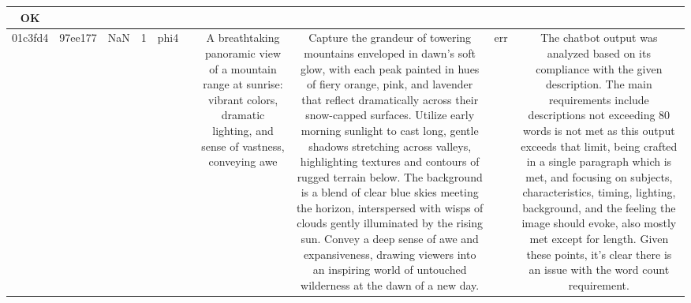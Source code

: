 \begin{table}[h!]
\begin{tabular}{|c|c|c|c|c|c|c|c|c|c|}
OK\\
\hline
01c3fd4 & 97ee177 & NaN & 1 & phi4 &  & A breathtaking panoramic view of a mountain range at sunrise: vibrant colors, dramatic lighting, and sense of vastness, conveying awe & Capture the grandeur of towering mountains enveloped in dawn's soft glow, with each peak painted in hues of fiery orange, pink, and lavender that reflect dramatically across their snow-capped surfaces. Utilize early morning sunlight to cast long, gentle shadows stretching across valleys, highlighting textures and contours of rugged terrain below. The background is a blend of clear blue skies meeting the horizon, interspersed with wisps of clouds gently illuminated by the rising sun. Convey a deep sense of awe and expansiveness, drawing viewers into an inspiring world of untouched wilderness at the dawn of a new day. & err & The chatbot output was analyzed based on its compliance with the given description. The main requirements include descriptions not exceeding 80 words is not met as this output exceeds that limit, being crafted in a single paragraph which is met, and focusing on subjects, characteristics, timing, lighting, background, and the feeling the image should evoke, also mostly met except for length. Given these points, it's clear there is an issue with the word count requirement.


\end{tabular}
\end{table}
